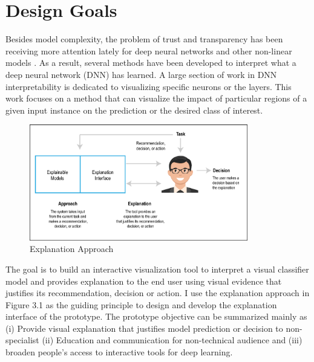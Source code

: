 

\section{Design Goals}

Besides model complexity, the problem of trust and transparency has been receiving more attention lately for deep neural networks and other non-linear models \cite{edseee.839741120170101} \cite{edseee.863755220180101} \cite{S003132031630358220170501}. As a result, several methods have been developed to interpret what a deep neural network (DNN) has learned. A large section of work in DNN interpretability is dedicated to visualizing specific neurons or the layers. This work focuses on a method that can visualize the impact of particular regions of a given input instance on the prediction or the desired class of interest.

\begin{figure}[htbp]
\centering
\includegraphics[width=0.85\textwidth]{images/xai-1.eps}
\caption{Explanation Approach}
\label{fig:explanation-approach}
\end{figure}

The goal is to build an interactive visualization tool to interpret a visual classifier model and provides explanation to the end user using visual evidence that justifies its recommendation, decision or action. I use the explanation approach in Figure 3.1 as the guiding principle to design and develop the explanation interface of the prototype.  The prototype objective can be summarized mainly as (i) Provide visual explanation that justifies model prediction or decision to non-specialist (ii) Education and communication for non-technical audience and (iii) broaden people's access to interactive tools for deep learning.

